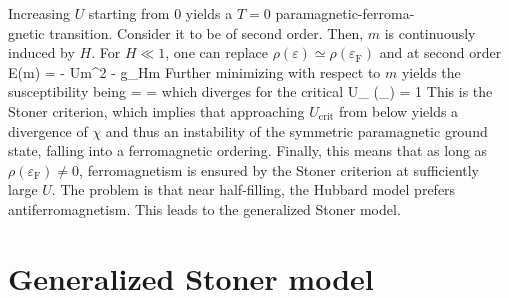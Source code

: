 		Increasing $U$ starting from $0$ yields a $T=0$ paramagnetic-ferroma-\\gnetic transition. Consider it to be of second order. Then, $m$ is continuously induced by $H$. For $H\ll 1$, one can replace $\rho(\varepsilon) \simeq \rho(\varepsilon_\text{F})$ and at second order
		\be \Delta \mc E(m) =  - Um^2 - g\mu_Hm \ee
		Further minimizing with respect to $m$ yields the susceptibility being
		\be \chi =  =   \ee
		which diverges for the critical
		\be U_ \rho(\varepsilon_) = 1 \label{eq:stoner} \ee
		This is the Stoner criterion, which implies that approaching $U_\text{crit}$ from below yields a divergence of $\chi$ and thus an instability of the symmetric paramagnetic ground state, falling into a ferromagnetic ordering. Finally, this means that as long as $\rho(\varepsilon_\text{F}) \neq 0$, ferromagnetism is ensured by the Stoner criterion at sufficiently large $U$. The problem is that near half-filling, the Hubbard model prefers antiferromagnetism. This leads to the generalized Stoner model.

	\section{Generalized Stoner model}

